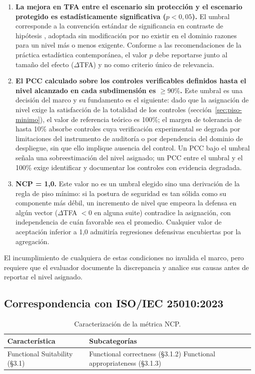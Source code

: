 \begin{enumerate}[leftmargin=2em]
  \item \textbf{La mejora en TFA entre el escenario sin protección y el escenario protegido es estadísticamente significativa ($p < 0{,}05$).} El umbral corresponde a la convención estándar de significancia en contraste de hipótesis \cite{asa2016}, adoptada sin modificación por no existir en el dominio razones para un nivel más o menos exigente. Conforme a las recomendaciones de la práctica estadística contemporánea, el valor $p$ debe reportarse junto al tamaño del efecto ($\Delta$TFA) y no como criterio único de relevancia.
  \item \textbf{El PCC calculado sobre los controles verificables definidos hasta el nivel alcanzado en cada subdimensión es $\geq 90\%$.} Este umbral es una decisión del marco y su fundamento es el siguiente: dado que la asignación de nivel exige la satisfacción de la totalidad de los controles (sección~\ref{sec:piso-minimo}), el valor de referencia teórico es 100\%; el margen de tolerancia de hasta 10\% absorbe controles cuya verificación experimental se degrada por limitaciones del instrumento de auditoría o por dependencia del dominio de despliegue, sin que ello implique ausencia del control. Un PCC bajo el umbral señala una sobreestimación del nivel asignado; un PCC entre el umbral y el 100\% exige identificar y documentar los controles con evidencia degradada.
  \item \textbf{NCP = 1{,}0.} Este valor no es un umbral elegido sino una derivación de la regla de piso mínimo: si la postura de seguridad es tan sólida como su componente más débil, un incremento de nivel que empeora la defensa en algún vector ($\Delta$TFA $< 0$ en alguna suite) contradice la asignación, con independencia de cuán favorable sea el promedio. Cualquier valor de aceptación inferior a 1{,}0 admitiría regresiones defensivas encubiertas por la agregación.
\end{enumerate}

El incumplimiento de cualquiera de estas condiciones no invalida el marco, pero requiere que el evaluador documente la discrepancia y analice sus causas antes de reportar el nivel asignado.

\subsection{Correspondencia con ISO/IEC 25010:2023}

\begin{table}[H]
  \centering
  \caption{Caracterización de la métrica NCP.}
  \label{tab:caract-ncp}
  \renewcommand{\arraystretch}{1.4}
  \begin{tabular}{
    >{\raggedright\arraybackslash}m{4cm}
    >{\raggedright\arraybackslash}m{7.5cm}
  }
  \toprule
  \textbf{Característica} & \textbf{Subcategorías} \\
  \midrule
  Functional Suitability (\S3.1) &
    Functional correctness (\S3.1.2) \newline
    Functional appropriateness (\S3.1.3) \\
  \bottomrule
  \end{tabular}
\end{table}